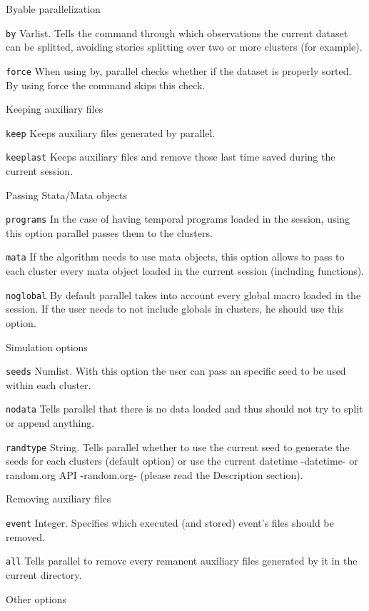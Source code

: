 \documentclass[bib]{statapress}
\begin{document}
\noindent Byable parallelization

\hangpara
{\tt by} Varlist. Tells the command through which observations the current dataset can be splitted, avoiding stories splitting over two or more clusters (for example).

\hangpara
{\tt force} When using by, parallel checks whether if the dataset is properly sorted. By using force the command skips this check.

\noindent Keeping auxiliary files

\hangpara
{\tt keep} Keeps auxiliary files generated by parallel.

\hangpara
{\tt keeplast} Keeps auxiliary files and remove those last time saved during the current session.

\noindent Passing Stata/Mata objects

\hangpara
{\tt programs} In the case of having temporal programs loaded in the session, using this option parallel passes them to the clusters.

\hangpara
{\tt mata} If the algorithm needs to use mata objects, this option allows to pass to each cluster every mata object loaded in the current session (including functions).

\hangpara
{\tt noglobal} By default parallel takes into account every global macro loaded in the session. If the user needs to not include globals in clusters, he should use this option.

\noindent Simulation options

\hangpara
{\tt seeds}  Numlist. With this option the user can pass an specific seed to be used within each cluster.

\hangpara
{\tt nodata} Tells parallel that there is no data loaded and thus should not try to split or append anything.

\hangpara
{\tt randtype} String. Tells parallel whether to use the current seed to generate the seeds for each clusters (default option) or use the current datetime -datetime- or random.org API -random.org- (please read the Description section).

\noindent Removing auxiliary files

\hangpara
{\tt event} Integer. Specifies which executed (and stored) event's files should be removed.

\hangpara
{\tt all} Tells parallel to remove every remanent auxiliary files generated by it in the current directory.

\noindent Other options
\end{document}
